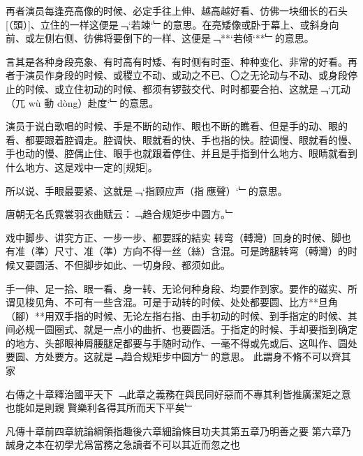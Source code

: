 \documentclass{zhvt-classic}
\begin{document}
再者演员每逢亮高像的时候、必定手往上伸、越高越好看、仿佛一块细长的石头[（頭）]、立住的一样这便是﹁`若竦`﹂的意思。在亮矮像或卧于幕上、或斜身向前、或左侧右侧、彷佛将要倒下的一样、这便是﹁**`若倾`**﹂的意思。

言其是各种身段亮象、有时高有时矮、有时侧有时歪、种种变化、非常的好看。再者于演员作身段的时候、或稷立不动、或动之不已、〇之无论动与不动、或身段停止的时候、或立住初动的时候、都须有锣鼓交代、时时都要合拍、这就是﹁`兀动（兀 wù 動 dòng）赴度`﹂的意思。

演员于说白歌唱的时候、手是不断的动作、眼也不断的瞧看、但是手的动、眼的看、都要跟着腔调走。腔调快、眼就看的快、手也指的快。腔调慢、眼就看的慢、手也动的慢、腔偶止住、眼手也就跟着停住、并且是手指到什么地方、眼睛就看到什么地方、这是戏中一定的[规矩]。

所以说、手眼最要紧、这就是﹁`指顾应声（指𮸹應聲）`﹂的意思。

\begin{preface}
  唐朝无名氏霓裳羽衣曲赋云：﹁趋合规矩步中圆方。﹂
\end{preface}

戏中脚步、讲究方正、一步一步、都要踩的結实 转弯（𨍭灣）回身的时候、脚也有准（準）尺寸、准（準）方向不得一丝（絲）含混。可是跨腿转弯（𨍭灣）的时候又要圆活、不但脚步如此、一切身段、都须如此。

手一伸、足一拾、眼一看、身一转、无论何种身段、均要作到家。要作的磁实、所谓见梭见角、不可有一些含混。可是于动转的时候、处处都要圆、比方**旦角（腳）**用双手指的时候、无论左指右指、由手初动的时候、到手指定的时候、其间必规一圆圈式、就是一点小的曲折、也要圆活。于指定的时候、手却要指到确定的地方、头部眼神屑腰腿足都要与手随时动作、一毫不得或先或后、这叫作、圆处要圆、方处要方。这就是﹁趋合规矩步中圆方﹂的意思。
此謂身不脩不可以齊其家

\begin{preface}
右傳之十章釋治國平天下
  ﹁此章之義務在與民同好惡而不專其利皆推廣潔矩之意也能如是則親
    賢樂利各得其所而天下平矣﹂

凡傳十章前四章統論綱領指趣後六章細論條目功夫其第五章乃明善之要
第六章乃誠身之本在初學尤爲當務之急讀者不可以其近而忽之也
\end{preface}
\end{document}
